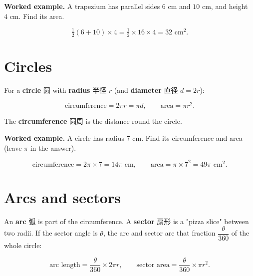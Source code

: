 \documentclass[11pt]{article}
\begin{document}
\begin{center}
\end{center}

\textbf{Worked example.} A trapezium has parallel sides $6\text{ cm}$ and $10\text{ cm}$, and height $4\text{ cm}$. Find its area.

\[
\tfrac{1}{2}(6 + 10) \times 4 = \tfrac{1}{2} \times 16 \times 4 = 32\text{ cm}^{2}.
\]

\section*{Circles}

For a \textbf{circle} 圆 with \textbf{radius} 半径 $r$ (and \textbf{diameter} 直径 $d = 2r$):

\[
\text{circumference} = 2\pi r = \pi d, \qquad \text{area} = \pi r^{2}.
\]

The \textbf{circumference} 圆周 is the distance round the circle.

\textbf{Worked example.} A circle has radius $7\text{ cm}$. Find its circumference and area (leave $\pi$ in the answer).

\[
\text{circumference} = 2\pi \times 7 = 14\pi\text{ cm}, \qquad \text{area} = \pi \times 7^{2} = 49\pi\text{ cm}^{2}.
\]

\section*{Arcs and sectors}

An \textbf{arc} 弧 is part of the circumference. A \textbf{sector} 扇形 is a "pizza slice" between two radii. If the sector angle is $\theta$, the arc and sector are that fraction $\dfrac{\theta}{360}$ of the whole circle:

\[
\text{arc length} = \frac{\theta}{360} \times 2\pi r, \qquad \text{sector area} = \frac{\theta}{360} \times \pi r^{2}.
\]
\end{document}
